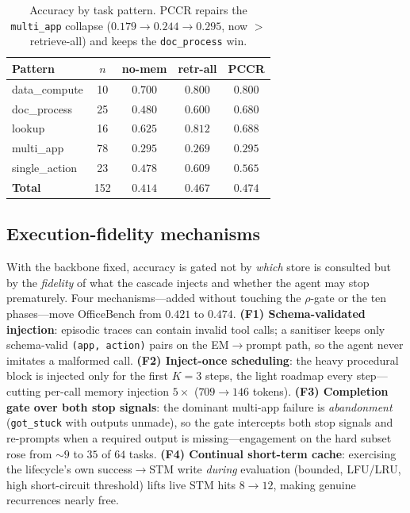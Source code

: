 \documentclass[10pt,twocolumn]{article}
\newcommand{\code}[1]{\texttt{\small #1}}
\begin{document}
\begin{table}[t]
\centering\small
\setlength{\tabcolsep}{4pt}
\begin{tabular}{@{}lcccc@{}}
\toprule
Pattern & $n$ & no-mem & retr-all & \textbf{PCCR} \\
\midrule
data\_compute  & 10 & $0.700$ & $\mathbf{0.800}$ & $\mathbf{0.800}$ \\
doc\_process   & 25 & $0.480$ & $0.600$ & $\mathbf{0.680}$ \\
lookup         & 16 & $0.625$ & $\mathbf{0.812}$ & $0.688$ \\
multi\_app     & 78 & $0.295$ & $0.269$ & $\mathbf{0.295}$ \\
single\_action & 23 & $0.478$ & $\mathbf{0.609}$ & $0.565$ \\
\midrule
\textbf{Total} & 152 & $0.414$ & $0.467$ & $\mathbf{0.474}$ \\
\bottomrule
\end{tabular}
\caption{Accuracy by task pattern. PCCR repairs the \code{multi\_app} collapse
($0.179{\to}0.244{\to}\mathbf{0.295}$, now $>$ retrieve-all) and keeps the \code{doc\_process} win.}
\label{tab:cg-pat}
\end{table}

\subsection{Execution-fidelity mechanisms}\label{sec:fidelity}
With the backbone fixed, accuracy is gated not by \emph{which} store is consulted but by the
\emph{fidelity} of what the cascade injects and whether the agent may stop prematurely. Four
mechanisms---added without touching the $\rho$-gate or the ten phases---move OfficeBench from
$0.421$ to $0.474$. \textbf{(F1) Schema-validated injection}: episodic traces can contain invalid tool
calls; a sanitiser keeps only schema-valid \code{(app, action)} pairs on the EM$\to$prompt path, so
the agent never imitates a malformed call. \textbf{(F2) Inject-once scheduling}: the heavy procedural
block is injected only for the first $K{=}3$ steps, the light roadmap every step---cutting per-call
memory injection $5\times$ ($709{\to}146$ tokens). \textbf{(F3) Completion gate over both stop
signals}: the dominant multi-app failure is \emph{abandonment} (\code{got\_stuck} with outputs unmade),
so the gate intercepts both stop signals and re-prompts when a required output is missing---engagement
on the hard subset rose from ${\sim}9$ to $35$ of $64$ tasks. \textbf{(F4) Continual short-term cache}:
exercising the lifecycle's own success$\to$STM write \emph{during} evaluation (bounded, LFU/LRU, high
short-circuit threshold) lifts live STM hits $8{\to}12$, making genuine recurrences nearly free.
\end{document}
